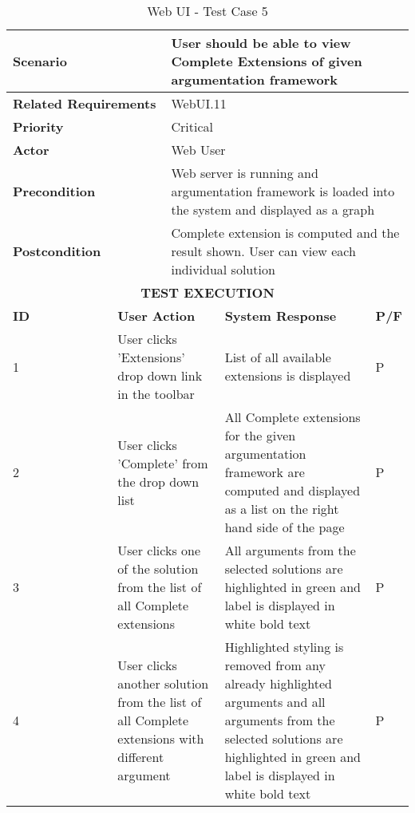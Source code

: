 \begin{longtable}[c]{p{}|p{}|p{}|p{}|p{}}
	\caption{Web UI - Test Case 5}
	\label{table:testcase5} \\
	\hline
	\multicolumn{2}{p{0.3\textwidth}}{\textbf{Scenario}} & \multicolumn{3}{p{0.6\textwidth}}{User should be able to view Complete Extensions of given argumentation framework} \\ 
	\hline
	\endfirsthead
	\endhead
	\multicolumn{2}{p{0.3\textwidth}}{\textbf{Related Requirements}} & \multicolumn{3}{p{0.6\textwidth}}{WebUI.11} \\ 
	\hline
	\multicolumn{2}{p{0.3\textwidth}}{\textbf{Priority}} & \multicolumn{3}{p{0.6\textwidth}}{Critical} \\ 
	\hline
	\multicolumn{2}{p{0.3\textwidth}}{\textbf{Actor}} & \multicolumn{3}{p{0.6\textwidth}}{Web User} \\ 
	\hline
	\multicolumn{2}{p{0.3\textwidth}}{\textbf{Precondition}} & \multicolumn{3}{p{0.6\textwidth}}{Web server is running and argumentation framework is loaded into the system and displayed as a graph} \\ 
	\hline
	\multicolumn{2}{p{0.3\textwidth}}{\textbf{Postcondition}} & \multicolumn{3}{p{0.6\textwidth}}{Complete extension is computed and the result shown. User can view each individual solution} \\ 
	\hline
	\multicolumn{5}{c}{\cellcolor{grey}\textbf{TEST EXECUTION}} \\ 
	\hline
	\textbf{ID} & \multicolumn{2}{|p{0.4\textwidth}|}{\textbf{User Action}} & \textbf{System Response} & \textbf{P/F} \\ 
	\hline
	1 & \multicolumn{2}{|p{0.4\textwidth}|}{User clicks 'Extensions' drop down link in the toolbar} & List of all available extensions is displayed & P \\ 
	\hline
	2 & \multicolumn{2}{|p{0.4\textwidth}|}{User clicks 'Complete' from the drop down list} & All Complete extensions for the given argumentation framework are computed and displayed as a list on the right hand side of the page & P \\ 
	\hline
	3 & \multicolumn{2}{|p{0.4\textwidth}|}{User clicks one of the solution from the list of all Complete extensions} & All arguments from the selected solutions are highlighted in green and label is displayed in white bold text & P \\ 
	\hline
	4 & \multicolumn{2}{|p{0.4\textwidth}|}{User clicks another solution from the list of all Complete extensions with different argument} & Highlighted styling is removed from any already highlighted arguments and all arguments from the selected solutions are highlighted in green and label is displayed in white bold text & P \\ 
	\hline
\end{longtable}

